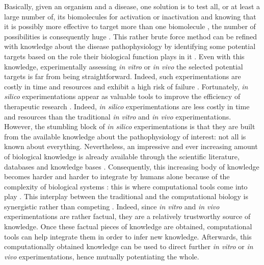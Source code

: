 \documentclass[oneside,a4paper,onecolumn,notitlepage]{article}
\begin{document}
Basically, given an organism and a disease, one solution is to test all, or at least a large number of, its biomolecules for activation or inactivation and knowing that it is possibly more effective to target more than one biomolecule \cite{zimmermann2007multi}, the number of possibilities is consequently huge \cite{ohlstein2000drug}. This rather brute force method can be refined with knowledge about the disease pathophysiology by identifying some potential targets based on the role their biological function plays in it \cite{gibbs2000mechanism}. Even with this knowledge, experimentally assessing \textit{in vitro} or \textit{in vivo} the selected potential targets is far from being straightforward. Indeed, such experimentations are costly in time and resources and exhibit a high risk of failure \cite{kaitin2010deconstructing}. Fortunately, \textit{in silico} experimentations appear as valuable tools to improve the efficiency of therapeutic research \cite{ma2010silico,noble1999biological}. Indeed, \textit{in silico} experimentations are less costly in time and resources than the traditional \textit{in vitro} and \textit{in vivo} experimentations. However, the stumbling block of \textit {in silico} experimentations is that they are built from the available knowledge about the pathophysiology of interest: not all is known about everything. Nevertheless, an impressive and ever increasing amount of biological knowledge is already available through the scientific literature, databases and knowledge bases \cite{chen2002ttd,whirl2012pharmacogenomics,kanehisa2000kegg,croft2011reactome,wishart2008drugbank}. Consequently, this increasing body of knowledge becomes harder and harder to integrate by humans alone because of the complexity of biological systems \cite{kitano2002systems}: this is where computational tools come into play \cite{kitano2002computational}. This interplay between the traditional and the computational biology is synergistic rather than competing \cite{di2006vivo}. Indeed, since \textit{in vitro} and \textit{in vivo} experimentations are rather factual, they are a relatively trustworthy source of knowledge. Once these factual pieces of knowledge are obtained, computational tools can help integrate them in order to infer new knowledge. Afterwards, this computationally obtained knowledge can be used to direct further \textit{in vitro} or \textit{in vivo} experimentations, hence mutually potentiating the whole.
\end{document}
